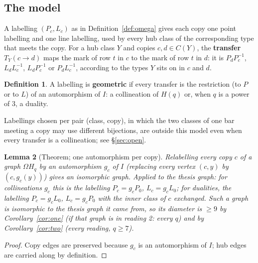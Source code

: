 \documentclass[11pt]{amsart}
\theoremstyle{plain}
\newtheorem{lemma}{Lemma}[section]
\theoremstyle{definition}
\newtheorem{definition}[lemma]{Definition}
\theoremstyle{remark}
\newcommand{\Om}{\Omega}
\newcommand{\pP}{P}  %
\newcommand{\lL}{L}  %
\begin{document}
\subsection{The model}
A labelling $(P_c, L_c)$ as in Definition~\ref{def:omega} gives each copy one point labelling and one line labelling,
used by every hub class of the corresponding type that meets the copy. For a hub class $Y$ and copies $c, d \in C(Y)$,
the \textbf{transfer} $T_Y(c \to d)$ maps the mark of row $t$ in $c$ to the mark of row $t$ in $d$: it is
$P_dP_c^{-1}$, $L_dL_c^{-1}$, $L_dP_c^{-1}$ or $P_dL_c^{-1}$, according to the types $Y$ sits on in $c$ and $d$.

\begin{definition}\label{def:geo}
A labelling is \textbf{geometric} if every transfer is the restriction (to $\pP$ or to $\lL$) of an automorphism of $I$:
a collineation of $H(q)$ or, when $q$ is a power of $3$, a duality.
\end{definition}

Labellings chosen per pair (class, copy), in which the two classes of one bar meeting a copy may use different
bijections, are outside this model even when every transfer is a collineation; see \S\ref{sec:open}.

\begin{lemma}[Theorem; one automorphism per copy]\label{lem:oneaut}
Relabelling every copy $c$ of a graph $\Om H_q$ by an automorphism $g_c$ of $I$ (replacing every vertex $(c,y)$ by
$(c, g_c(y))$) gives an isomorphic graph. Applied to the thesis graph: for collineations $g_c$ this is the labelling
$P_c = g_cP_0$, $L_c = g_cL_0$; for dualities, the labelling $P_c = g_cL_0$, $L_c = g_cP_0$ with the inner class of $c$
exchanged. Such a graph is isomorphic to the thesis graph it came from, so its diameter is $\ge 9$ by
Corollary~\ref{cor:one} (if that graph is in reading 2: every $q$) and by Corollary~\ref{cor:two} (every reading,
$q \ge 7$).
\end{lemma}

\begin{proof}
Copy edges are preserved because $g_c$ is an automorphism of $I$; hub edges are carried along by definition.
\end{proof}
\end{document}
